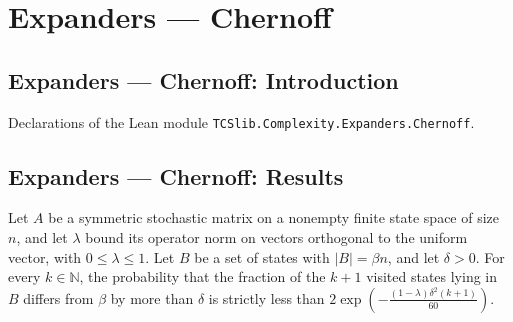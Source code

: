\section{Expanders --- Chernoff}
\subsection*{Expanders --- Chernoff: Introduction}

Declarations of the Lean module \texttt{TCSlib.Complexity.Expanders.Chernoff}.

\subsection*{Expanders --- Chernoff: Results}

\begin{theorem}
\label{Expander.walk_visits_concentration}
\leanok
{}
Let $A$ be a symmetric stochastic matrix on a nonempty finite state space of size $n$,
and let $\lambda$ bound its operator norm on vectors orthogonal to the uniform vector,
with $0\leq\lambda\leq1$. Let $B$ be a set of states with $|B|=\beta n$, and let
$\delta>0$. For every $k\in\mathbb N$, the probability that the fraction of the $k+1$
visited states lying in $B$ differs from $\beta$ by more than $\delta$ is strictly less
than $2\exp\!\left(-\frac{(1-\lambda)\delta^2(k+1)}{60}\right)$.
\end{theorem}
